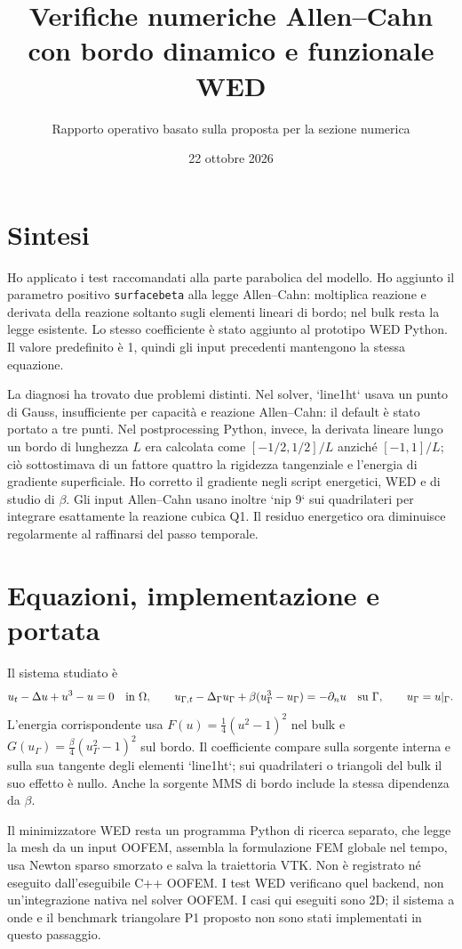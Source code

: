 \documentclass[10pt,a4paper]{article}
\title{Verifiche numeriche Allen--Cahn con bordo dinamico e funzionale WED}
\author{Rapporto operativo basato sulla proposta per la sezione numerica}
\date{22 ottobre 2026}
\begin{document}
\maketitle

\section*{Sintesi}
Ho applicato i test raccomandati alla parte parabolica del modello. Ho aggiunto il parametro positivo \texttt{surfacebeta} alla legge Allen--Cahn: moltiplica reazione e derivata della reazione soltanto sugli elementi lineari di bordo; nel bulk resta la legge esistente. Lo stesso coefficiente è stato aggiunto al prototipo WED Python. Il valore predefinito è 1, quindi gli input precedenti mantengono la stessa equazione.

La diagnosi ha trovato due problemi distinti. Nel solver, `line1ht` usava un punto di Gauss, insufficiente per capacità e reazione Allen--Cahn: il default è stato portato a tre punti. Nel postprocessing Python, invece, la derivata lineare lungo un bordo di lunghezza $L$ era calcolata come $[-1/2,1/2]/L$ anziché $[-1,1]/L$; ciò sottostimava di un fattore quattro la rigidezza tangenziale e l'energia di gradiente superficiale. Ho corretto il gradiente negli script energetici, WED e di studio di $\beta$. Gli input Allen--Cahn usano inoltre `nip 9` sui quadrilateri per integrare esattamente la reazione cubica Q1. Il residuo energetico ora diminuisce regolarmente al raffinarsi del passo temporale.

\section{Equazioni, implementazione e portata}
Il sistema studiato è
\[
 u_t-\Delta u+u^3-u=0\quad\hbox{in }\Omega,\qquad
 u_{\Gamma,t}-\Delta_\Gamma u_\Gamma+\beta(u_\Gamma^3-u_\Gamma)=-\partial_nu\quad\hbox{su }\Gamma,
 \qquad u_\Gamma=u|_\Gamma.
\]
L'energia corrispondente usa $F(u)=\frac14(u^2-1)^2$ nel bulk e $G(u_\Gamma)=\frac{\beta}{4}(u_\Gamma^2-1)^2$ sul bordo. Il coefficiente compare sulla sorgente interna e sulla sua tangente degli elementi `line1ht`; sui quadrilateri o triangoli del bulk il suo effetto è nullo. Anche la sorgente MMS di bordo include la stessa dipendenza da $\beta$.

Il minimizzatore WED resta un programma Python di ricerca separato, che legge la mesh da un input OOFEM, assembla la formulazione FEM globale nel tempo, usa Newton sparso smorzato e salva la traiettoria VTK. Non è registrato né eseguito dall'eseguibile C++ OOFEM. I test WED verificano quel backend, non un'integrazione nativa nel solver OOFEM. I casi qui eseguiti sono 2D; il sistema a onde e il benchmark triangolare P1 proposto non sono stati implementati in questo passaggio.
\end{document}

